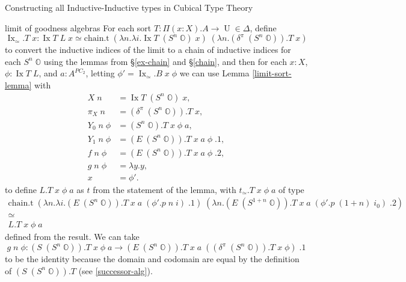 \documentclass[runningheads]{llncs}
\DeclareMathOperator{\UU}{U}
\DeclareMathOperator{\Ix}{Ix}
\newcommand{\bbO}{\mathbb{O}}
\begin{document}
{\begin{section}{Constructing all Inductive-Inductive types in Cubical Type Theory}
\begin{subsection}{limit of goodness algebras}
For each sort $T : \Pi(x : X).A \to \UU \in \Delta$, define \[\Ix_\simeq.T\;x : \Ix T\;L\;x\simeq\text{chain.t}\;(\lambda n.\lambda i.\Ix T\;(S^n\;\bbO)\;x)\;(\lambda n.(\delta^\pi\;(S^n\;\bbO)).T\;x)\] to convert the inductive indices of the limit to a chain of inductive indices for each $S^n\;\bbO$ using the lemmas from \S\ref{ex-chain} and \S\ref{chain},
and then for each $x : X$, $\phi : \Ix T\;L$, and $a : A^{PC_2}$, letting $\phi' = \Ix_\simeq.B\;x\;\phi$ we can use Lemma \ref{limit-sort-lemma} with \begin{align*}
X\;n &= \Ix T\;(S^n\;\bbO)\;x,\\
\pi_X\;n &= (\delta^\pi\;(S^n\;\bbO)).T\;x,\\
Y_0\;n\;\phi &= (S^n\;\bbO).T\;x\;\phi\;a,\\
Y_1\;n\;\phi &= (E\;(S^n\;\bbO)).T\;x\;a\;\phi\;.1,\\
f\;n\;\phi &= (E\;(S^n\;\bbO)).T\;x\;a\;\phi\;.2,\\
g\;n\;\phi &= \lambda y.y,\\
x &= \phi'.
\end{align*}
to define $L.T\;x\;\phi\;a$ as $t$ from the statement of the lemma, with $t_\simeq.T\;x\;\phi\;a$ of type \begin{gather*}\text{chain.t}\;(\lambda n.\lambda i.(E\;(S^n\;\bbO)).T\;x\;a\;(\phi'.p\;n\;i)\;.1)\;(\lambda n.(E\;(S^{1+n}\;\bbO)).T\;x\;a\;(\phi'.p\;(1+n)\;i_0)\;.2)\\ \simeq\\ L.T\;x\;\phi\;a\end{gather*} defined from the result. We can take \[g\;n\;\phi : (S\;(S^n\;\bbO)).T\;x\;\phi\;a \to (E\;(S^n\;\bbO)).T\;x\;a\;((\delta^\pi\;(S^n\;\bbO)).T\;x\;\phi)\;.1\] to be the identity because the domain and codomain are equal by the definition of $(S\;(S^n\;\bbO)).T$ (see \ref{successor-alg}).


\end{subsection}
\end{section}}
\end{document}

